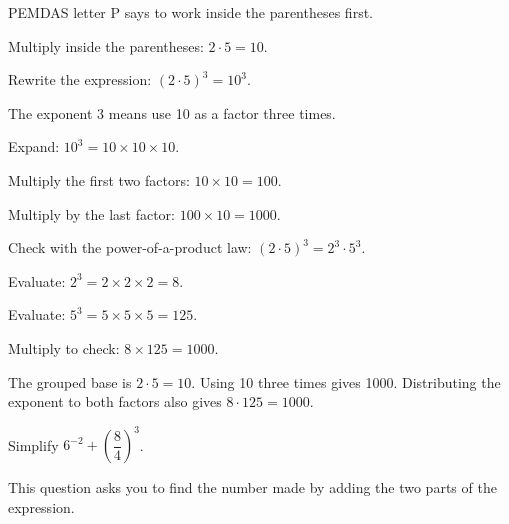 \begin{steps}
  \item PEMDAS letter P says to work inside the parentheses first.
  \item Multiply inside the parentheses: $2 \cdot 5 = 10$.
  \item Rewrite the expression: $(2 \cdot 5)^{3} = 10^{3}$.
  \item The exponent 3 means use 10 as a factor three times.
  \item Expand: $10^{3} = 10 \times 10 \times 10$.
  \item Multiply the first two factors: $10 \times 10 = 100$.
  \item Multiply by the last factor: $100 \times 10 = 1000$.
  \item Check with the power-of-a-product law:
    $(2 \cdot 5)^{3} = 2^{3} \cdot 5^{3}$.
  \item Evaluate: $2^{3} = 2 \times 2 \times 2 = 8$.
  \item Evaluate: $5^{3} = 5 \times 5 \times 5 = 125$.
  \item Multiply to check: $8 \times 125 = 1000$.
\end{steps}


The grouped base is $2 \cdot 5 = 10$. Using 10 three times gives 1000.
Distributing the exponent to both factors also gives $8 \cdot 125 = 1000$.


Simplify $6^{-2} + \left(\dfrac{8}{4}\right)^{3}$.


This question asks you to find the number made by adding the two parts of the
expression.

